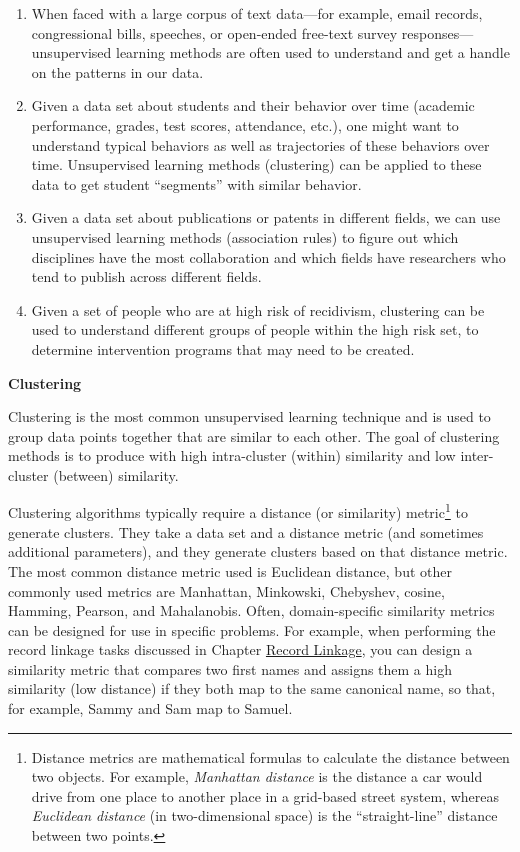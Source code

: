 \documentclass[]{krantz}
\begin{document}
\begin{enumerate}
\def\labelenumi{\arabic{enumi}.}
\item
  When faced with a large corpus of text data---for example, email
  records, congressional bills, speeches, or open-ended free-text survey
  responses---unsupervised learning methods are often used to understand
  and get a handle on the patterns in our data.
\item
  Given a data set about students and their behavior over time (academic
  performance, grades, test scores, attendance, etc.), one might want to
  understand typical behaviors as well as trajectories of these
  behaviors over time. Unsupervised learning methods (clustering) can be
  applied to these data to get student ``segments'' with similar
  behavior.
\item
  Given a data set about publications or patents in different fields, we
  can use unsupervised learning methods (association rules) to figure
  out which disciplines have the most collaboration and which fields
  have researchers who tend to publish across different fields.
\item
  Given a set of people who are at high risk of recidivism, clustering
  can be used to understand different groups of people within the high
  risk set, to determine intervention programs that may need to be
  created.
\end{enumerate}

\textbf{Clustering}

Clustering is the most common unsupervised learning technique and is
used to group data points together that are similar to each other. The
goal of clustering methods is to produce with high intra-cluster
(within) similarity and low inter-cluster (between) similarity.

Clustering algorithms typically require a distance (or similarity)
metric\footnote{Distance metrics are mathematical formulas to calculate
  the distance between two objects. For example, \emph{Manhattan
  distance} is the distance a car would drive from one place to another
  place in a grid-based street system, whereas \emph{Euclidean distance}
  (in two-dimensional space) is the ``straight-line'' distance between
  two points.} to generate clusters. They take a data set and a distance
metric (and sometimes additional parameters), and they generate clusters
based on that distance metric. The most common distance metric used is
Euclidean distance, but other commonly used metrics are Manhattan,
Minkowski, Chebyshev, cosine, Hamming, Pearson, and Mahalanobis. Often,
domain-specific similarity metrics can be designed for use in specific
problems. For example, when performing the record linkage tasks
discussed in Chapter \protect\hyperlink{chap:link}{Record Linkage}, you
can design a similarity metric that compares two first names and assigns
them a high similarity (low distance) if they both map to the same
canonical name, so that, for example, Sammy and Sam map to Samuel.
\end{document}

